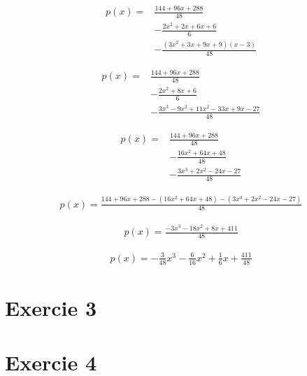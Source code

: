\documentclass[12pt, letterpaper]{article}
\begin{document}
\begin{equation*}
\begin{split}
  p(x) = & \frac{144 + 96x + 288}{48} \\
         & -\frac{2x^2 + 2x + 6x + 6}{6} \\
         & -\frac{(3x^2 + 3x + 9x + 9)(x - 3)}{48}
\end{split}
\end{equation*}

\begin{equation*}
\begin{split}
  p(x) = & \frac{144 + 96x + 288}{48} \\
         & -\frac{2x^2 + 8x + 6}{6} \\
         & -\frac{3x^3 - 9x^2 + 11x^2 - 33x + 9x - 27}{48}
\end{split}
\end{equation*}

\begin{equation*}
\begin{split}
  p(x) = & \frac{144 + 96x + 288}{48} \\
         & -\frac{16x^2 + 64x + 48}{48} \\
         & -\frac{3x^3 + 2x^2 - 24x - 27}{48}
\end{split}
\end{equation*}

\begin{equation*}
\begin{split}
  p(x) = \frac{144 + 96x + 288 - (16x^2 + 64x + 48) - (3x^3 + 2x^2 - 24x - 27)}{48}
\end{split}
\end{equation*}

\begin{equation*}
\begin{split}
  p(x) = \frac{-3x^3 - 18x^2 + 8x + 411}{48}
\end{split}
\end{equation*}

\begin{equation*}
\begin{split}
  p(x) = -\frac{3}{48}x^3 - \frac{6}{16}x^2 + \frac{1}{6}x + \frac{411}{48}
\end{split}
\end{equation*}

\section{Exercie 3}
\section{Exercie 4}
\end{document}

